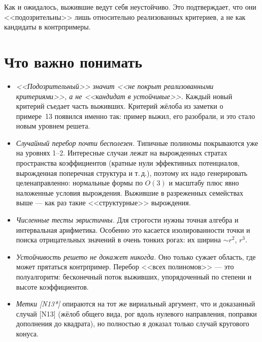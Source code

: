 \documentclass[11pt,a4paper]{article}
\begin{document}
Как и ожидалось, выжившие ведут себя неустойчиво. Это подтверждает, что они <<подозрительны>> лишь
относительно реализованных критериев, а не как кандидаты в контрпримеры.


\section{Что важно понимать}
\begin{itemize}[leftmargin=*]
\item \emph{<<Подозрительный>> значит <<не покрыт реализованными критериями>>, а не <<кандидат в устойчивые>>.}
Каждый новый критерий съедает часть выживших. Критерий жёлоба из заметки о примере~13 появился именно так:
пример выжил, его разобрали, и это стало новым уровнем решета.
\item \emph{Случайный перебор почти бесполезен.} Типичные полиномы покрываются уже на уровнях 1--2.
Интересные случаи лежат на вырожденных стратах пространства коэффициентов (кратные нули эффективных
потенциалов, вырожденная поперечная структура и т.\,д.), поэтому их надо генерировать целенаправленно:
нормальные формы по $O(3)$ и масштабу плюс явно наложенные условия вырождения. Выжившие в разреженных
семействах выше --- как раз такие <<структурные>> вырождения.
\item \emph{Численные тесты эвристичны.} Для строгости нужны точная алгебра и интервальная арифметика.
Особенно это касается изолированности точки и поиска отрицательных значений в очень тонких рогах:
их ширина $\sim r^2$, $r^3$.
\item \emph{Устойчивость решето не докажет никогда.} Оно только сужает область, где может прятаться
контрпример. Перебор <<всех полиномов>> --- это полуалгоритм: бесконечный поток выживших, упорядоченный по
степени и высоте коэффициентов.
\item \emph{Метки [N13*]} опираются на тот же вириальный аргумент, что и доказанный случай [N13]
(жёлоб общего вида, рог вдоль нулевого направления, поправки дополнения до квадрата), но полностью я
доказал только случай кругового конуса.
\end{itemize}
\end{document}
